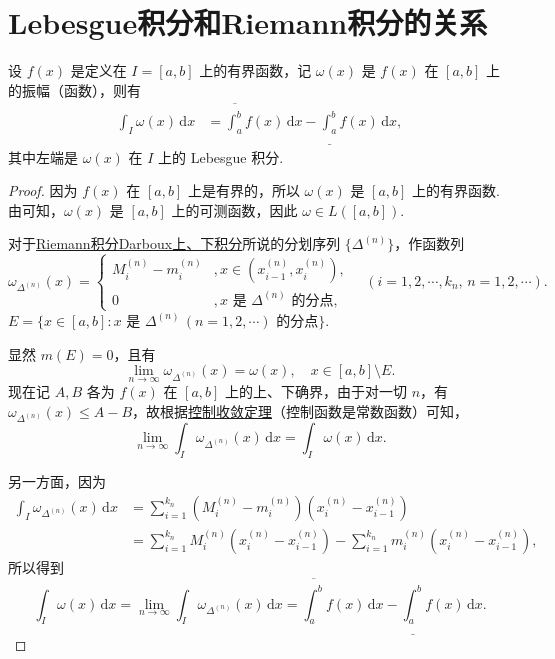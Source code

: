 \documentclass[../../main.tex]{subfiles}%
\begin{document}
\section{Lebesgue积分和Riemann积分的关系}

\begin{lemma}\label{lemma:引理4.23}
设 \( f(x) \) 是定义在 \( I = [a,b] \) 上的有界函数，记 \( \omega(x) \) 是 \( f(x) \) 在 \( [a,b] \) 上的振幅（函数），则有
\begin{align*}
\int_I \omega(x) \, \mathrm{d}x &= \overline{\int_a^b} f(x) \, \mathrm{d}x - \underline{\int_a^b} f(x) \, \mathrm{d}x,
\end{align*}
其中左端是 \( \omega(x) \) 在 \( I \) 上的 Lebesgue 积分.
\end{lemma}
\begin{proof}

因为 \( f(x) \) 在 \( [a,b] \) 上是有界的，所以 \( \omega(x) \) 是 \( [a,b] \) 上的有界函数. 由可知，\( \omega(x) \) 是 \( [a,b] \) 上的可测函数，因此 \( \omega \in L([a,b]) \).

对于\hyperref[Basis-of-Analytics-definition:Riemann积分Darboux上下积分]{Riemann积分Darboux上、下积分}所说的分划序列 \( \{\Delta^{(n)}\} \)，作函数列
\[
\omega_{\Delta^{(n)}}(x) = 
\begin{cases} 
M_i^{(n)} - m_i^{(n)} &, x \in (x_{i-1}^{(n)}, x_i^{(n)}), \\
0 & ,x \text{ 是 } \Delta^{(n)} \text{ 的分点},
\end{cases}
\quad (i = 1,2,\cdots,k_n,\, n = 1,2,\cdots).
\]
\( E = \{ x \in [a,b] : x \text{ 是 } \Delta^{(n)} \, (n = 1,2,\cdots) \text{ 的分点} \} \).

显然 \( m(E) = 0 \)，且有
\[
\lim_{n \to \infty} \omega_{\Delta^{(n)}}(x) = \omega(x), \quad x \in [a,b] \setminus E.
\]
现在记 \( A,B \) 各为 \( f(x) \) 在 \( [a,b] \) 上的上、下确界，由于对一切 \( n \)，有 \( \omega_{\Delta^{(n)}}(x) \leqslant  A - B \)，故根据\hyperref[theorem:控制收敛定理]{控制收敛定理}（控制函数是常数函数）可知，
\[
\lim_{n \to \infty} \int_I \omega_{\Delta^{(n)}}(x) \, \mathrm{d}x = \int_I \omega(x) \, \mathrm{d}x.
\]

另一方面，因为
\begin{align*}
\int_I \omega_{\Delta^{(n)}}(x) \, \mathrm{d}x &= \sum_{i=1}^{k_n} (M_i^{(n)} - m_i^{(n)})(x_i^{(n)} - x_{i-1}^{(n)}) \\
&= \sum_{i=1}^{k_n} M_i^{(n)}(x_i^{(n)} - x_{i-1}^{(n)}) - \sum_{i=1}^{k_n} m_i^{(n)}(x_i^{(n)} - x_{i-1}^{(n)}),
\end{align*}
所以得到
\[
\int_I \omega(x) \, \mathrm{d}x = \lim_{n \to \infty} \int_I \omega_{\Delta^{(n)}}(x) \, \mathrm{d}x = \overline{\int_a^b} f(x) \, \mathrm{d}x - \underline{\int_a^b} f(x) \, \mathrm{d}x.
\]

\end{proof}
\end{document}
